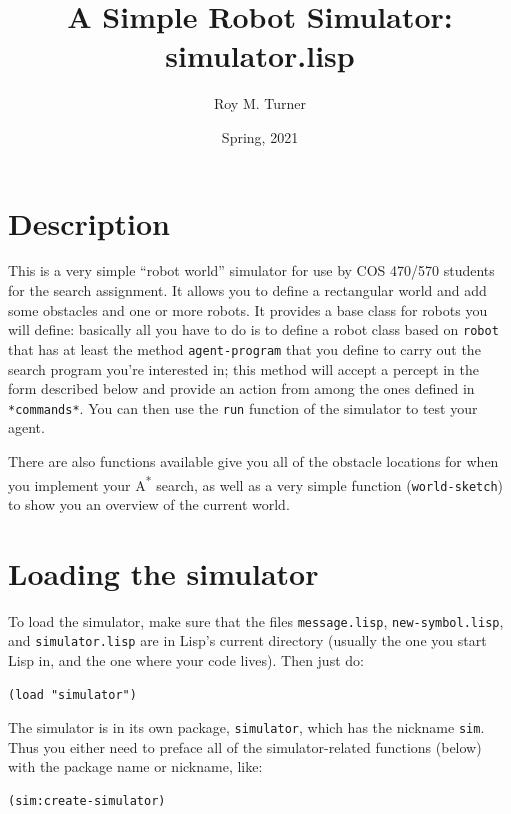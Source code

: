 \documentclass[11pt]{tufte-handout}
\author{Roy M. Turner}
\date{Spring, 2021}
\title{A Simple Robot Simulator: simulator.lisp}
\begin{document}
\maketitle
\tableofcontents

\titlepage
\maketitle

\section{Description}
\label{sec:org3175ed4}

This is a very simple ``robot world''  simulator for use by COS 470/570  students for the search assignment. It allows you to define a rectangular world and add some obstacles and one or more robots.  It provides a base class for robots you will define: basically all you have to do is to define a robot class based on \texttt{robot} that has at least the method \texttt{agent-program} that you define to carry out the search program you're interested in; this method will accept a percept in the form described below and provide an action from among the ones defined in \texttt{*commands*}.  You can then use the \texttt{run} function of the simulator to test your agent.  

There are also functions available give you all of the obstacle locations for when you implement your A\textsuperscript{*} search, as well as a very simple function (\texttt{world-sketch}) to show you an overview of the current world.

\section{Loading the simulator}
\label{sec:org0ce29d5}

To load the simulator, make sure that the files \texttt{message.lisp}, \texttt{new-symbol.lisp}, and \texttt{simulator.lisp} are in Lisp's current directory (usually the one you start Lisp in, and the one where your code lives).  Then just do:
\begin{verbatim}
(load "simulator")
\end{verbatim}


The simulator is in its own package, \texttt{simulator}, which has the nickname \texttt{sim}.  Thus you either need to preface all of the simulator-related functions (below) with the package name or nickname, like:
\begin{verbatim}
(sim:create-simulator)
\end{verbatim}
\end{document}
